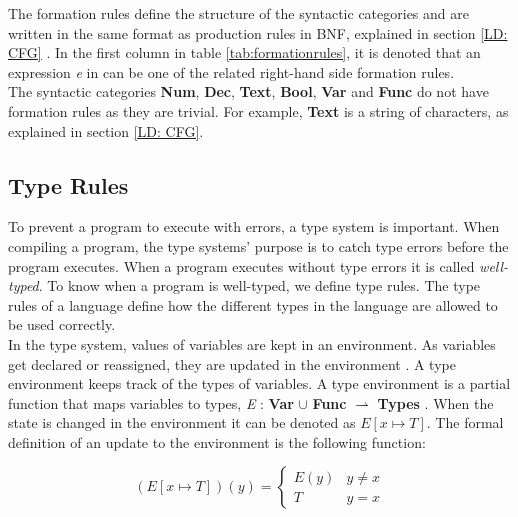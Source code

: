 \noindent The formation rules define the structure of the syntactic categories and are written in the same format as production rules in BNF, explained in section \ref{LD: CFG} \cite{SS_lecture_8}. In the first column in table \ref{tab:formationrules}, it is denoted that an expression \textit{e} in \lang can be one of the related right-hand side formation rules. \\

The syntactic categories \textbf{Num}, \textbf{Dec}, \textbf{Text}, \textbf{Bool}, \textbf{Var} and \textbf{Func} do not have formation rules as they are trivial. For example, \textbf{Text} is a string of characters, as explained in section \ref{LD: CFG}. 

\subsection{Type Rules} \label{sec:TypeRules}
To prevent a program to execute with errors, a type system is important. When compiling a program, the type systems' purpose is to catch type errors before the program executes. When a program executes without type errors it is called \textit{well-typed}. To know when a program is well-typed, we define type rules. The type rules of a language define how the different types in the language are allowed to be used correctly. \\


In the type system, values of variables are kept in an environment. As variables get declared or reassigned, they are updated in the environment \cite{SS_lecture_10}. A type environment keeps track of the types of variables. A type environment is a partial function that maps variables to types, \textit{E} : \textbf{Var} $\cup$ \textbf{Func} $\rightharpoonup$ \textbf{Types} \cite{SS_lecture_10}. When the state is changed in the environment it can be denoted as $E[x \mapsto T]$. The formal definition of an update to the environment is the following function:

\begin{equation}
    (E[x\mapsto T])(y) = \begin{cases}E(y) &  y \neq x\\T & y = x\end{cases}
\end{equation}

